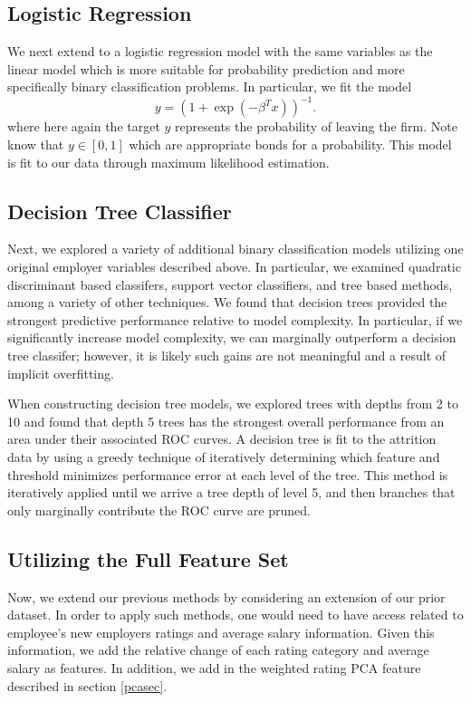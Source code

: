 \documentclass[10pt]{article}
\begin{document}
\subsection{Logistic Regression} We next extend to a logistic regression model with the 
same variables as the linear model which 
is more suitable for probability prediction and more specifically binary classification 
problems.   In particular, we fit the model 
%
\begin{equation}
    y = (1+\exp(-\beta^Tx))^{-1}.
\end{equation}
% 
where here again the target $y$ represents the probability of leaving the firm. 
Note know that $y\in[0,1]$ which are appropriate bonds for a probability.  This 
model is fit to our data through maximum likelihood estimation. 

\subsection{Decision Tree Classifier}  Next, we explored a variety of additional 
binary classification models utilizing one original employer variables described above.
In particular, we examined quadratic discriminant based classifers, support vector classifiers, 
and tree based methods, among a variety of other techniques.  We found that decision 
trees provided the strongest predictive performance relative to model complexity. 
In particular, if we significantly increase model complexity, we can marginally outperform 
a decision tree classifer; however, it is likely such gains are not meaningful and 
a result of implicit overfitting. 


When constructing decision tree models, we explored trees with depths from 2 to 10 and 
found that depth 5 trees has the strongest overall performance from an area under their 
associated ROC curves. 
A decision tree is fit to the attrition data by using a greedy technique of 
iteratively determining which feature and threshold minimizes performance error 
at each level of the tree.  This method is iteratively applied until we arrive 
a tree depth of level 5, and then branches that only marginally contribute 
the ROC curve are pruned.  

\subsection{Utilizing the Full Feature Set} 
Now, we extend our previous methods by considering an extension of our 
prior dataset.  In order to apply such methods, one would need to have 
access related to employee's new employers ratings and average salary information.
Given this information, we add the relative change of each rating category and average 
salary as features.  In addition, we add in the weighted rating PCA feature 
described in section \ref{pcasec}.
\end{document}
